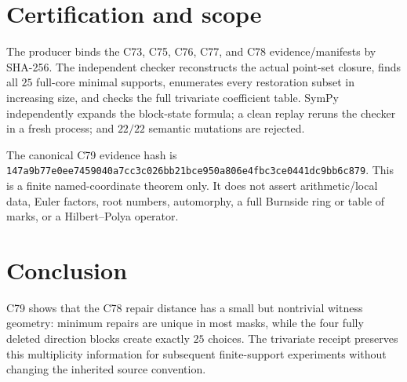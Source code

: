 \documentclass[10pt]{article}
\begin{document}
\section{Certification and scope}
The producer binds the C73, C75, C76, C77, and C78 evidence/manifests by
SHA-256.  The independent checker reconstructs the actual point-set closure,
finds all $25$ full-core minimal supports, enumerates every restoration subset
in increasing size, and checks the full trivariate coefficient table.
SymPy independently expands the block-state formula; a clean replay reruns
the checker in a fresh process; and $22/22$ semantic mutations are rejected.

The canonical C79 evidence hash is
\texttt{147a9b77e0ee7459040a7cc3c026bb21bce950a806e4fbc3ce0441dc9bb6c879}.
This is a finite named-coordinate theorem only.  It does not assert
arithmetic/local data, Euler factors, root numbers, automorphy, a full
Burnside ring or table of marks, or a Hilbert--Polya operator.

\section{Conclusion}
C79 shows that the C78 repair distance has a small but nontrivial witness
geometry: minimum repairs are unique in most masks, while the four fully
deleted direction blocks create exactly $25$ choices.  The trivariate receipt
preserves this multiplicity information for subsequent finite-support
experiments without changing the inherited source convention.
\end{document}
